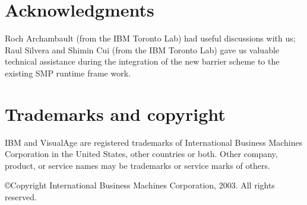 \section{Acknowledgments}

Roch Archambault (from the IBM Toronto Lab) had useful discussions with us;
Raul Silvera and Shimin Cui (from the IBM Toronto Lab) gave us valuable
technical assistance during the integration of the new barrier scheme
to the existing SMP runtime frame work.

\section{Trademarks and copyright}

\textregistered IBM and VisualAge are registered trademarks of
International Business Machines Corporation in the United States,
other countries or both. Other company, product, or service names may
be trademarks or service marks of others.

\noindent
\copyright Copyright International Business Machines Corporation,
2003. All rights reserved.

